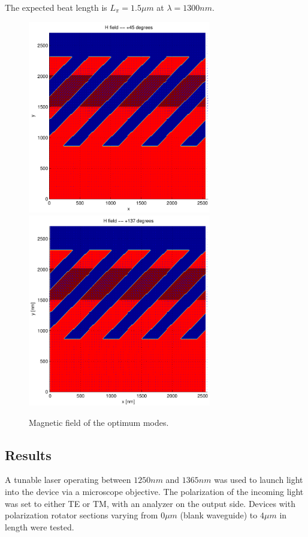 The expected beat length is $L_\pi = 1.5 \mu m$ at $\lambda = 1300
nm$.

\begin{figure}[htbp]
  \begin{center}
    \includegraphics[width=8cm]{pics/polrot_optimum_1}
    \includegraphics[width=8cm]{pics/polrot_optimum_2}
  \end{center}
  \caption{Magnetic field of the optimum modes.}
  \label{fig:polrot_optimum}
\end{figure}

\subsection{Results}

A tunable laser operating between $1250 nm$ and $1365 nm$ was used to
launch light into the device via a microscope objective. The
polarization of the incoming light was set to either TE or TM, with an
analyzer on the output side. Devices with polarization rotator
sections varying from $0 \mu m$ (blank waveguide) to $4 \mu m$ in
length were tested.


